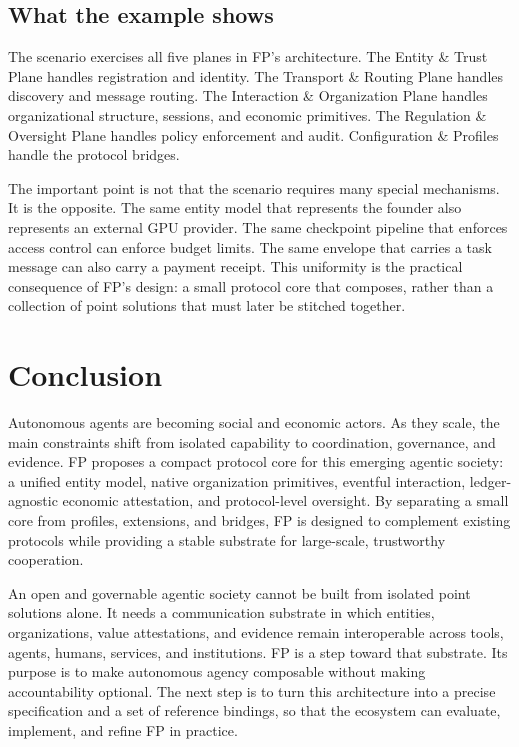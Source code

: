 \documentclass{llmxive}
\begin{document}
\subsection{What the example shows}
\label{subsec:scenario-takeaway}

The scenario exercises all five planes in FP's architecture. The Entity \& Trust Plane handles registration and identity. The Transport \& Routing Plane handles discovery and message routing. The Interaction \& Organization Plane handles organizational structure, sessions, and economic primitives. The Regulation \& Oversight Plane handles policy enforcement and audit. Configuration \& Profiles handle the protocol bridges.

The important point is not that the scenario requires many special mechanisms. It is the opposite. The same entity model that represents the founder also represents an external GPU provider. The same checkpoint pipeline that enforces access control can enforce budget limits. The same envelope that carries a task message can also carry a payment receipt. This uniformity is the practical consequence of FP's design: a small protocol core that composes, rather than a collection of point solutions that must later be stitched together.


\section{Conclusion}
\label{sec:conclusion}

Autonomous agents are becoming social and economic actors. As they scale, the main constraints shift from isolated capability to coordination, governance, and evidence. FP proposes a compact protocol core for this emerging agentic society: a unified entity model, native organization primitives, eventful interaction, ledger-agnostic economic attestation, and protocol-level oversight. By separating a small core from profiles, extensions, and bridges, FP is designed to complement existing protocols while providing a stable substrate for large-scale, trustworthy cooperation.

An open and governable agentic society cannot be built from isolated point solutions alone. It needs a communication substrate in which entities, organizations, value attestations, and evidence remain interoperable across tools, agents, humans, services, and institutions. FP is a step toward that substrate. Its purpose is to make autonomous agency composable without making accountability optional. The next step is to turn this architecture into a precise specification and a set of reference bindings, so that the ecosystem can evaluate, implement, and refine FP in practice.
\end{document}
